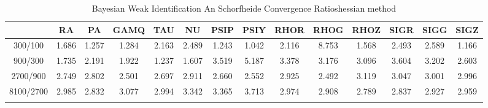 \documentclass[a4paper,10pt]{article}
\begin{document}
\centering
\begin{longtable}{cccccccccccccc}
\toprule
 & RA & PA & GAMQ & TAU & NU & PSIP & PSIY & RHOR & RHOG & RHOZ & SIGR & SIGG & SIGZ \\
\midrule
300/100 & 1.686 & 1.257 & 1.284 & 2.163 & 2.489 & 1.243 & 1.042 & 2.116 & 8.753 & 1.568 & 2.493 & 2.589 & 1.166 \\
900/300 & 1.735 & 2.191 & 1.922 & 1.237 & 1.607 & 3.519 & 5.187 & 3.378 & 3.176 & 3.096 & 3.604 & 3.202 & 2.603 \\
2700/900 & 2.749 & 2.802 & 2.501 & 2.697 & 2.911 & 2.660 & 2.552 & 2.925 & 2.492 & 3.119 & 3.047 & 3.001 & 2.996 \\
8100/2700 & 2.985 & 2.832 & 3.077 & 2.994 & 3.342 & 3.365 & 3.713 & 2.974 & 2.908 & 2.789 & 2.837 & 2.927 & 2.959 \\
\bottomrule
\caption{Bayesian Weak Identification An Schorfheide Convergence Ratioshessian method}
\label{table:tbl:WeakAnSchoConvergenceRatios_hessian}
\end{longtable}
\end{document}
